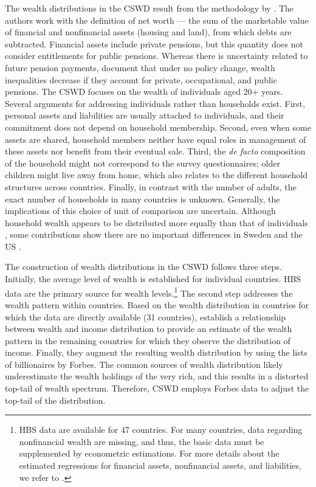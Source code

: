 \begin{refsection}
The wealth distributions in the \ac{CSWD} result from the methodology by \textcite{daviesetal2017}. The authors work with the definition of net worth --- the sum of the marketable value of financial and nonfinancial assets (housing and land), from which debts are subtracted. Financial assets include private pensions, but this quantity does not consider entitlements for public pensions. Whereas there is uncertainty related to future pension payments, \textcite{bonke2017} document that under no policy change, wealth inequalities decrease if they account for private, occupational, and public pensions. The \ac{CSWD} focuses on the wealth of individuals aged 20+ years. Several arguments for addressing individuals rather than households exist. First, personal assets and liabilities are usually attached to individuals, and their commitment does not depend on household membership. Second, even when some assets are shared, household members neither have equal roles in management of these assets nor benefit from their eventual sale. Third, the \textit{de facto} composition of the household might not correspond to the survey questionnaires; older children might live away from home, which also relates to the different household structures across countries. Finally, in contrast with the number of adults, the exact number of households in many countries is unknown. Generally, the implications of this choice of unit of comparison are uncertain. Although household wealth appears to be distributed more equally than that of individuals \textcite{atkinson2007top}, some contributions show there are no important differences in Sweden and the US \parencite{roine2009wealth,kopczuksaez2004}. 

The construction of wealth distributions in the \ac{CSWD} follows three steps. Initially, the average level of wealth is established for individual countries. \ac{HBS} data are the primary source for wealth levels.\footnote{\ac{HBS} data are available for 47 countries. For many countries, data regarding nonfinancial wealth are missing, and thus, the basic data must be supplemented by econometric estimations. For more details about the estimated regressions for financial assets, nonfinancial assets, and liabilities, we refer to \textcite{daviesetal2017}.} The second step addresses the wealth pattern within countries. Based on the wealth distribution in countries for which the data are directly available (31 countries), \textcite{daviesetal2017} establish a relationship between wealth and income distribution to provide an estimate of the wealth pattern in the remaining countries for which they observe the distribution of income. Finally, they augment the resulting wealth distribution by using the lists of billionaires by Forbes. The common sources of wealth distribution likely underestimate the wealth holdings of the very rich, and this results in a distorted top-tail of wealth spectrum. Therefore, \ac{CSWD} employs Forbes data to adjust the top-tail of the distribution.
%
%
%
%
%

\end{refsection}
